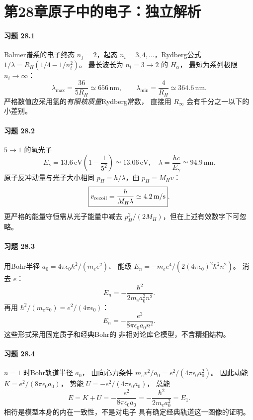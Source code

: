 \section*{第28章\quad 原子中的电子：独立解析}
\paragraph{习题 28.1}
Balmer谱系的电子终态 \(n_f=2\)，起态
\(n_i=3,4,\ldots\)，Rydberg公式
\(1/\lambda=R_H(1/4-1/n_i^2)\)。
最长波长为 \(n_i=3\to2\) 的 \(H_\alpha\)，
最短为系列极限 \(n_i\to\infty\)：
\[
\boxed{\lambda_{\max}=\frac{36}{5R_H}\simeq656\,\mathrm{nm}},
\qquad
\boxed{\lambda_{\min}=\frac4{R_H}\simeq364.6\,\mathrm{nm}}.
\]
严格数值应采用氢的\emph{有限核质量}Rydberg常数，
直接用 \(R_\infty\) 会有千分之一以下的小差别。

\paragraph{习题 28.2}
\(5\to1\) 的氢光子
\[
E_\gamma=13.6\,\mathrm{eV}
\left(1-\frac1{5^2}\right)\simeq13.06\,\mathrm{eV},
\quad\boxed{\lambda=\frac{hc}{E_\gamma}\simeq94.9\,\mathrm{nm}}.
\]
原子反冲动量与光子大小相同
\(p_H=h/\lambda\)，由 \(p_H=M_Hv\)：
\[
\boxed{v_{\rm recoil}=\frac{h}{M_H\lambda}
\simeq4.2\,\mathrm{m/s}}.
\]
更严格的能量守恒需从光子能量中减去
\(p_H^2/(2M_H)\)，但在上述有效数字下可忽略。

\paragraph{习题 28.3}
用Bohr半径
\(a_0=4\pi\epsilon_0\hbar^2/(m_ee^2)\)、
能级 \(E_n=-m_ee^4/(2(4\pi\epsilon_0)^2\hbar^2n^2)\)。
消去 \(e\)：
\[
\boxed{E_n=-\frac{\hbar^2}{2m_ea_0^2n^2}}.
\]
再用 \(\hbar^2/(m_ea_0)=e^2/(4\pi\epsilon_0)\)：
\[
\boxed{E_n=-\frac{e^2}{8\pi\epsilon_0a_0n^2}}.
\]
这些形式采用固定质子和经典Bohr的
非相对论库仑模型，不含精细结构。

\paragraph{习题 28.4}
\(n=1\) 时Bohr轨道半径 \(a_0\)，
由向心力条件
\(m_ev^2/a_0=e^2/(4\pi\epsilon_0a_0^2)\)。
因此动能 \(K=e^2/(8\pi\epsilon_0a_0)\)，
势能 \(U=-e^2/(4\pi\epsilon_0a_0)\)，
总能
\[
\boxed{E=K+U=-\frac{e^2}{8\pi\epsilon_0a_0}
=-\frac{\hbar^2}{2m_ea_0^2}=E_1}.
\]
相符是模型本身的内在一致性，不是对电子
具有确定经典轨道这一图像的证明。

